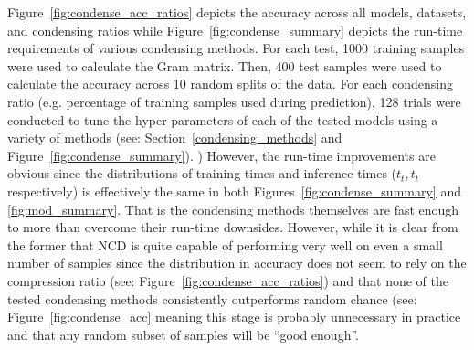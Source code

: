 \documentclass[conference]{IEEEtran}
\begin{document}
Figure~\ref{fig:condense_acc_ratios} depicts the accuracy across all models, datasets, and condensing ratios while Figure~\ref{fig:condense_summary} depicts the run-time requirements of various condensing methods. 
For each test, 1000 training samples were used to calculate the Gram matrix. 
Then, 400 test samples were used to calculate the accuracy across 10 random splits of the data. 
For each condensing ratio (e.g. percentage of training samples used during prediction), 128 trials were conducted to tune the hyper-parameters of each of the tested models using a variety of methods (see: Section~\ref{condensing_methods} and Figure~\ref{fig:condense_summary}). 
) However, the run-time improvements are obvious since the distributions of training times and inference times ($t_t, t_t$ respectively) is effectively the same in both Figures~\ref{fig:condense_summary} and \ref{fig:mod_summary}. That is the condensing methods themselves are fast enough to more than overcome their run-time downsides. However, while it is clear from the former that NCD is quite capable of performing very well on even a small number of samples since the distribution in accuracy does not seem to rely on the compression ratio (see: Figure~\ref{fig:condense_acc_ratios}) and that none of the tested condensing methods consistently outperforms random chance (see: Figure~\ref{fig:condense_acc} meaning this stage is probably unnecessary in practice and that any random subset of samples will be ``good enough''. 

\end{document}
